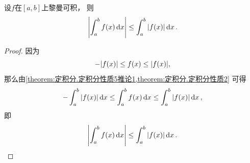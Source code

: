 \begin{corollary}\label{theorem:定积分.定积分性质5推论2}
设\(f\)在\([a,b]\)上黎曼可积，
则\begin{equation}
	\abs{\int_a^b f(x) \dd{x}} \leq \int_a^b \abs{f(x)} \dd{x}.
\end{equation}
\begin{proof}
因为\begin{equation*}
	-\abs{f(x)} \leq f(x) \leq \abs{f(x)},
\end{equation*}
那么由\cref{theorem:定积分.定积分性质5推论1,theorem:定积分.定积分性质2} 可得\begin{equation*}
	-\int_a^b \abs{f(x)} \dd{x}
	\leq
	\int_a^b f(x) \dd{x}
	\leq
	\int_a^b \abs{f(x)} \dd{x},
\end{equation*}
即\begin{equation*}
	\abs{\int_a^b f(x) \dd{x}} \leq \int_a^b \abs{f(x)} \dd{x}.
	\qedhere
\end{equation*}
\end{proof}
\end{corollary}

